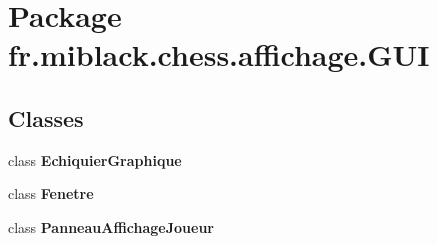 \section{Package fr.\-miblack.\-chess.\-affichage.\-G\-U\-I}
\label{namespacefr_1_1miblack_1_1chess_1_1affichage_1_1GUI}
\subsection*{Classes}
\begin{DoxyCompactItemize}
\item 
class {\bf Echiquier\-Graphique}
\item 
class {\bf Fenetre}
\item 
class {\bf Panneau\-Affichage\-Joueur}
\end{DoxyCompactItemize}
